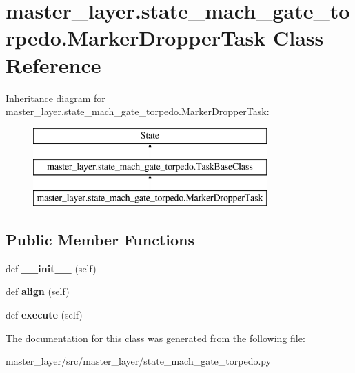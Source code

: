 \hypertarget{classmaster__layer_1_1state__mach__gate__torpedo_1_1MarkerDropperTask}{}\section{master\+\_\+layer.\+state\+\_\+mach\+\_\+gate\+\_\+torpedo.\+Marker\+Dropper\+Task Class Reference}
\label{classmaster__layer_1_1state__mach__gate__torpedo_1_1MarkerDropperTask}
Inheritance diagram for master\+\_\+layer.\+state\+\_\+mach\+\_\+gate\+\_\+torpedo.\+Marker\+Dropper\+Task\+:\begin{figure}[H]
\begin{center}
\leavevmode
\includegraphics[height=3.000000cm]{classmaster__layer_1_1state__mach__gate__torpedo_1_1MarkerDropperTask}
\end{center}
\end{figure}
\subsection*{Public Member Functions}
\begin{DoxyCompactItemize}
\item 
\mbox{\label{classmaster__layer_1_1state__mach__gate__torpedo_1_1MarkerDropperTask_a51d7db6f46c0a8cf283320f26d2f6c7f}} 
def {\bfseries \+\_\+\+\_\+init\+\_\+\+\_\+} (self)
\item 
\mbox{\label{classmaster__layer_1_1state__mach__gate__torpedo_1_1MarkerDropperTask_a86aae57d8f860d9875c2dc8a7387cff6}} 
def {\bfseries align} (self)
\item 
\mbox{\label{classmaster__layer_1_1state__mach__gate__torpedo_1_1MarkerDropperTask_adac8439216ad70cd3424f46129d6e2a0}} 
def {\bfseries execute} (self)
\end{DoxyCompactItemize}


The documentation for this class was generated from the following file\+:\begin{DoxyCompactItemize}
\item 
master\+\_\+layer/src/master\+\_\+layer/state\+\_\+mach\+\_\+gate\+\_\+torpedo.\+py\end{DoxyCompactItemize}
